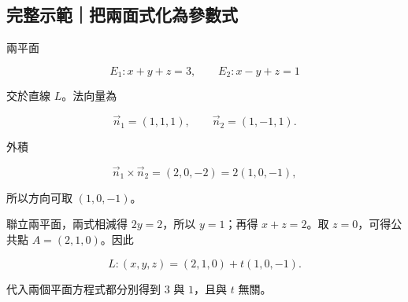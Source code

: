 \documentclass[11pt,a4paper]{article}
\begin{document}
\begin{HandoutWorkedExample}

\subsection{完整示範｜把兩面式化為參數式}\label{ux5b8cux6574ux793aux7bc4ux628aux5169ux9762ux5f0fux5316ux70baux53c3ux6578ux5f0f}

兩平面

\[
E_1:x+y+z=3,
\qquad
E_2:x-y+z=1
\]

交於直線 \(L\)。法向量為

\[
\vec n_1=(1,1,1),
\qquad
\vec n_2=(1,-1,1).
\]

外積

\[
\vec n_1\times\vec n_2=(2,0,-2)=2(1,0,-1),
\]

所以方向可取 \((1,0,-1)\)。

聯立兩平面，兩式相減得 \(2y=2\)，所以 \(y=1\)；再得 \(x+z=2\)。取 \(z=0\)，可得公共點 \(A=(2,1,0)\)。因此

\[
\boxed{
L:(x,y,z)=(2,1,0)+t(1,0,-1)
}.
\]

代入兩個平面方程式都分別得到 \(3\) 與 \(1\)，且與 \(t\) 無關。

\end{HandoutWorkedExample}
\end{document}
